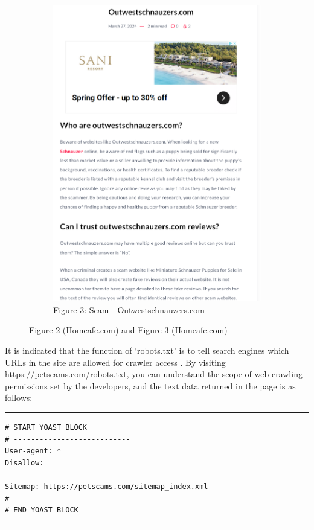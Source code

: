 \documentclass[ oneside,%
                    author={Cassie Qing Tang},
                    degree={BSc},
                     title={An Automated Response System for Disrupting Online Pet Scamming \\ },
                    subtitle={ }]{dissertation}
\begin{document}
\begin{figure}[!htb]
\begin{subfigure}[b]{0.45\textwidth}
        \includegraphics[width=\linewidth]{pic/figure3.png}
        \caption{Figure 3: Scam - Outwestschnauzers.com}
        \label{fig:sub3}
    \end{subfigure}
    \caption{Figure 2 (Homeafc.com) and Figure 3 (Homeafc.com)}
    \label{fig:main2}
\end{figure}

It is indicated that the function of ‘robots.txt’ is to tell search engines which URLs in the site are allowed for crawler access \cite{noauthor_robotstxt_nodate}. By visiting \url{https://petscams.com/robots.txt}, you can understand the scope of web crawling permissions set by the developers, and the text data returned in the page is as follows:
\vspace{10pt}

\noindent\hrule  
\begin{verbatim}
# START YOAST BLOCK
# ---------------------------
User-agent: *
Disallow:

Sitemap: https://petscams.com/sitemap_index.xml
# ---------------------------
# END YOAST BLOCK
\end{verbatim}
\hrule  
\vspace{10pt}
\end{document}
